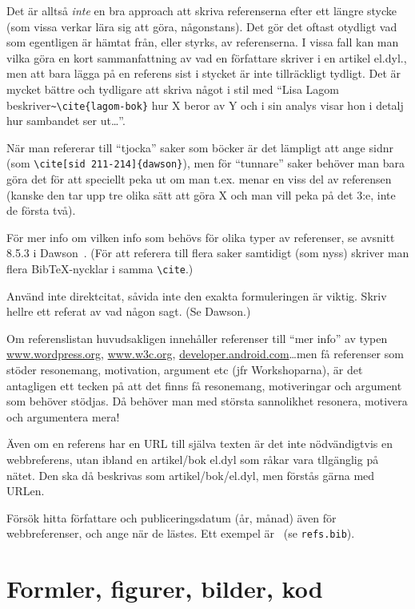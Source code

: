 \documentclass[a4paper,12pt]{article}
\begin{document}
Det är alltså \emph{inte} en bra approach att skriva referenserna efter ett längre stycke (som vissa verkar lära sig att göra, någonstans). Det gör det oftast otydligt vad som egentligen är hämtat från, eller styrks, av referenserna. I vissa fall kan man vilka göra en kort sammanfattning av vad en författare skriver i en artikel el.dyl., men att bara lägga på en referens sist i stycket är inte tillräckligt tydligt. Det är mycket bättre och tydligare att skriva något i stil med ``Lisa Lagom beskriver\verb|~\cite{lagom-bok}| hur X beror av Y och i sin analys visar hon i detalj hur sambandet ser ut\ldots''.

När man refererar till ``tjocka'' saker som böcker är det lämpligt att ange sidnr
(som \verb|\cite[sid 211-214]{dawson}|), men för ``tunnare'' saker behöver man bara göra det för att speciellt peka ut om man t.ex. menar en viss del av referensen (kanske den tar upp tre olika sätt att göra X och man vill peka på det 3:e, inte de första två).

För mer info om vilken info som behövs för olika typer av referenser, se avsnitt 8.5.3 i Dawson~\cite{dawson:projects-in-computing,dawson:projects-in-computing-old}. (För att referera till flera saker samtidigt (som nyss) skriver man flera BibTeX-nycklar i samma \verb|\cite|.)

Använd inte direktcitat, såvida inte den exakta formuleringen är viktig.  Skriv hellre ett referat av vad någon sagt. (Se Dawson.)

Om referenslistan huvudsakligen innehåller referenser till ``mer info'' av typen
\url{www.wordpress.org}, \url{www.w3c.org}, \url{developer.android.com}\ldots men få referenser som stöder resonemang, motivation, argument etc (jfr Workshoparna), är det antagligen ett tecken på att det finns få resonemang, motiveringar och argument som behöver stödjas. Då behöver man med största sannolikhet resonera, motivera och argumentera mera!

Även om en referens har en URL till själva texten är det inte nödvändigtvis en webbreferens, utan ibland en artikel/bok el.dyl som råkar vara tllgänglig på nätet. Den ska då beskrivas som artikel/bok/el.dyl, men förstås gärna med URLen.

Försök hitta författare och publiceringsdatum (år, månad) även för webbreferenser, och ange när de lästes. Ett exempel är~\cite{berners-lee:cool-uris} (se \texttt{refs.bib}).



\section{Formler, figurer, bilder, kod}
\label{sec:forml-figur-bild}
\end{document}

